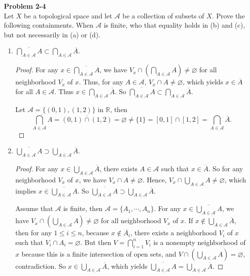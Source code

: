 \documentclass[12pt, a4paper]{article}
\theoremstyle{plain}
\newcommand{\A}{\mathscr{A}}
\newcommand{\R}{\mathbb{R}}
\newenvironment{problem}[2][Problem]
    { \begin{mdframed}[backgroundcolor=gray!20] \textbf{#1 #2} \\}
    {  \end{mdframed}}
\begin{document}
\begin{problem}{2-4}
Let $X$ be a topological space and let $\A$ be a collection of subsets of $X$. Prove the following containments. When $\A$ is finite, who that equality holds in (b) and (c), but not necessarily in (a) or (d).
\begin{enumerate}[label=(\alph*)]
\item $\overline{\bigcap_{A\in\A}A}\subset \bigcap_{A\in\A}\overline{A}$.
	\begin{proof}
	For any $x\in \overline{\bigcap_{A\in\A}A}$, we have $V_x\cap (\bigcap_{A\in\A}A)\neq \varnothing$ for all neighborhood $V_x$ of $x$. Thus, for any $A\in\A$, $V_x\cap A\neq \varnothing$, which yields $x\in \overline{A}$ for all $A\in\A$. Thus $x\in \bigcap_{A\in\A}\overline{A}$. So $\overline{\bigcap_{A\in\A}A}\subset \bigcap_{A\in\A}\overline{A}$.
	
	Let $\A=\{(0,1),(1,2)\}$ in $\R$, then 
	\[
	\overline{\bigcap_{A\in\A}A}=\overline{(0,1)\cap (1,2)}=\varnothing\neq \{1\}=[0,1]\cap [1,2]= \bigcap_{A\in\A}\overline{A}.
	\]
	\end{proof}

\item $\overline{\bigcup_{A\in\A}A}\supset \bigcup_{A\in\A}\overline{A}$.
	\begin{proof}
	For any $x\in \bigcup_{A\in\A}\overline{A}$, there exists $A\in\A$ such that $x\in\overline{A}$. So for any neighborhood $V_x$ of $x$, we have $V_x\cap A\neq\varnothing$. Hence, $V_x\cap \bigcup_{A\in\A}A\neq \varnothing$, which implies $x\in \overline{\bigcup_{A\in\A}A}$. So $\overline{\bigcup_{A\in\A}A}\supset \bigcup_{A\in\A}\overline{A}$.
	
	Assume that $\A$ is finite, then $\A=\{A_1,\cdots,A_n\}$. For any $x\in \overline{\bigcup_{A\in\A}A}$, we have $V_x\cap \left(\bigcup_{A\in\A}A\right)\neq \varnothing$ for all neighborhood $V_x$ of $x$. If $x\notin \bigcup_{A\in\A}\overline{A}$, then for any $1\leq i\leq n$, because $x\notin \overline{A_i}$, there exists a neighborhood $V_i$ of $x$ such that $V_i\cap A_i=\varnothing$. But then $V=\bigcap_{i=1}^nV_i$ is a nonempty neighborhood of $x$ because this is a finite intersection of open sets, and $V\cap \left(\bigcup_{A\in\A}A\right)= \varnothing$, contradiction. So $x\in\bigcup_{A\in\A}\overline{A}$, which yields $\overline{\bigcup_{A\in\A}A}= \bigcup_{A\in\A}\overline{A}$.
	\end{proof}

\pagebreak


\end{enumerate}
\end{problem}
\end{document}
